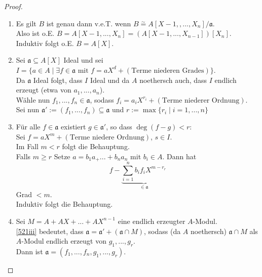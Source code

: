 \documentclass[10pt,a4paper]{article}
\newcommand{\isomorph}{\ensuremath{\overset{\sim}{=}}}
\theoremstyle{definition}
\theoremstyle{plain}
\theoremstyle{remark}
\begin{document}
\begin{proof}
	\begin{enumerate}
		\item Es gilt $B$ ist genau dann v.e.T. wenn $B\isomorph A[X-1,,...,X_n]/\mathfrak a$.\\
		Also ist o.E. $B=A[X-1,...,X_n]=(A[X-1,...,X_{n-1}])[X_n]$.\\
		Induktiv folgt o.E. $B=A[X]$.
		
		\item Sei $\mathfrak a\subseteq A[X]$ Ideal und sei \\
		$I=\{a\in A\mid\exists f\in\mathfrak a\text{ mit }f=aX^d+(\text{Terme niederen Grades})\}$.\\
		Da $\mathfrak a$ Ideal folgt, dass $I$ Ideal und da $A$ noethersch auch, dass $I$ endlich erzeugt (etwa von $a_1,...,a_n$).\\
		Wähle nun $f_1,...,f_n\in\mathfrak a$, sodass $f_i=a_iX^{r_i}+(\text{Terme niederer Ordnung})$.\\
		Sei nun $\mathfrak a':=(f_1,...,f_n)\subseteq \mathfrak a$ und $r:=\max\{r_i\mid i=1,...,n\}$
		
		\item \label{521iii}Für alle $f\in \mathfrak a$ existiert $g\in\mathfrak a'$, so dass $\deg(f-g)<r$:\\
		Sei $f=aX^m+(\text{Terme niedere Ordnung})$, $s\in I$.\\
		Im Fall $m<r$ folgt die Behauptung.\\
		Falls $m\geq r$ Setze $a=b_1a_+...+b_na_n$ mit $b_i\in A$. Dann hat
		\[f-\underbrace{\sum_{i=1}^{n}b_if_iX^{m-r_r}}_{\in\mathfrak a}\]
		Grad $<m$.\\
		Induktiv folgt die Behauptung.
		
		\item Sei $M=A+AX+...+AX^{n-1}$ eine endlich erzeugter $A$-Modul.\\
		\ref{521iii} bedeutet, dass $\mathfrak a=\mathfrak a'+(\mathfrak a\cap M)$, sodass (da $A$ noethersch) $\mathfrak a\cap M$ als $A$-Modul endlich erzeugt von $g_1,...,g_r$.\\
		Dann ist $\mathfrak a=(f_1,...,f_n,g_1,...,g_r)$.
	\end{enumerate}
\end{proof}
\end{document}
